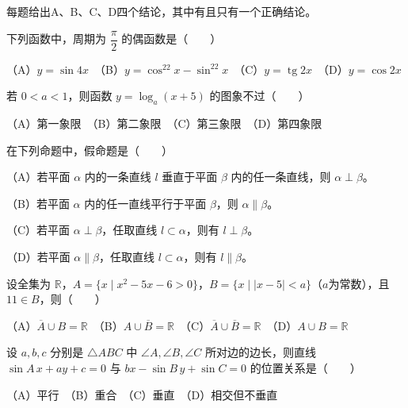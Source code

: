 每题给出A、B、C、D四个结论，其中有且只有一个正确结论。

\begin{question}
下列函数中，周期为 $\dfrac\pi2$ 的偶函数是\mbox{（　　）}

（A）$y=\sin4x$　（B）$y=\cos^22x-\sin^22x$　（C）$y=\operatorname{tg}2x$　（D）$y=\cos2x$

\end{question}
\begin{question}
若 $0<a<1$，则函数 $y=\log_a(x+5)$ 的图象不过\mbox{（　　）}

（A）第一象限　（B）第二象限　（C）第三象限　（D）第四象限

\end{question}
\begin{question}
在下列命题中，假命题是\mbox{（　　）}

（A）若平面 $\alpha$ 内的一条直线 $l$ 垂直于平面 $\beta$ 内的任一条直线，则 $\alpha\perp\beta$。

（B）若平面 $\alpha$ 内的任一直线平行于平面 $\beta$，则 $\alpha\parallel\beta$。

（C）若平面 $\alpha\perp\beta$，任取直线 $l\subset\alpha$，则有 $l\perp\beta$。

（D）若平面 $\alpha\parallel\beta$，任取直线 $l\subset\alpha$，则有 $l\parallel\beta$。

\end{question}
\begin{question}
设全集为 $\mathbb R$，$A=\{x\mid x^2-5x-6>0\}$，$B=\{x\mid |x-5|<a\}$（$a$为常数），且 $11\in B$，则\mbox{（　　）}

（A）$\overline A\cup B=\mathbb R$　（B）$A\cup\overline B=\mathbb R$　（C）$\overline A\cup\overline B=\mathbb R$　（D）$A\cup B=\mathbb R$

\end{question}
\begin{question}
设 $a,b,c$ 分别是 $\triangle ABC$ 中 $\angle A,\angle B,\angle C$ 所对边的边长，则直线
$\sin A\,x+ay+c=0$ 与 $bx-\sin B\,y+\sin C=0$ 的位置关系是\mbox{（　　）}

（A）平行　（B）重合　（C）垂直　（D）相交但不垂直

\end{question}

